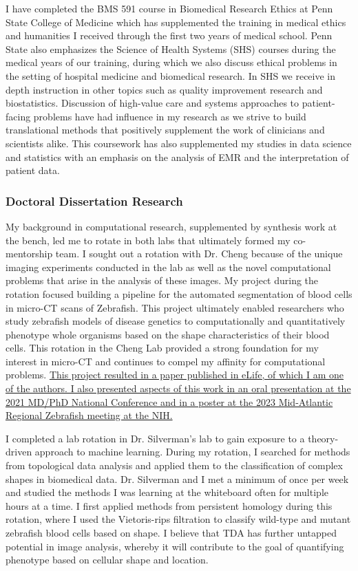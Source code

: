 \documentclass{NIHGrant}
\begin{document}
I have completed the BMS 591 course in Biomedical Research Ethics at Penn State College of Medicine which has supplemented the training in medical ethics and humanities I received through the first two years of medical school. Penn State also emphasizes the Science of Health Systems (SHS) courses during the medical years of our training, during which we also discuss ethical problems in the setting of hospital medicine and
biomedical research. In SHS we receive in depth instruction in other topics such as quality improvement research and biostatistics. Discussion of high-value care and systems approaches to patient-facing problems have had influence in my research as we strive to build translational methods that positively supplement the work of clinicians and scientists alike. This coursework has also supplemented my studies in data science and statistics with an emphasis on the analysis of EMR and the interpretation of patient data.

\subsubsection*{Doctoral Dissertation Research}
My background in computational research, supplemented by synthesis work at the bench, led me to rotate in both labs that ultimately formed my co-mentorship team. I sought out a rotation with Dr. Cheng because of the unique imaging experiments conducted in the lab as well as the novel computational problems that arise in the analysis of these images. My project during the rotation focused building a  pipeline for the automated segmentation of blood cells in micro-CT scans of Zebrafish. This project ultimately enabled researchers who study zebrafish models of disease genetics to computationally and quantitatively phenotype whole organisms based on the shape characteristics of their blood cells. This rotation in the Cheng Lab provided a strong foundation for my interest in micro-CT and continues to compel my affinity for computational problems. \uline{This project resulted in a paper published in eLife, of which I am one of the authors. I also presented aspects of this work in an oral presentation at the 2021 MD/PhD National Conference and in a poster at the 2023 Mid-Atlantic Regional Zebrafish meeting at the NIH.}

I completed a lab rotation in Dr. Silverman's lab to gain exposure to a theory-driven approach to machine learning. During my rotation, I searched for methods from topological data analysis and applied them to the classification of complex shapes in biomedical data. Dr. Silverman and I met a minimum of once per week and studied the methods I was learning at the whiteboard often for multiple hours at a time. I first applied methods from persistent homology during this rotation, where I used the Vietoris-rips filtration to classify wild-type and mutant zebrafish blood cells based on shape. I believe that TDA has further untapped potential in image analysis, whereby it will contribute to the goal of quantifying phenotype based on cellular shape and location.
\end{document}

